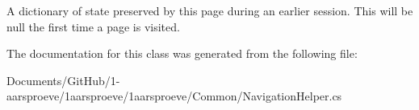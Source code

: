 A dictionary of state preserved by this page during an earlier session. This will be null the first time a page is visited. 



The documentation for this class was generated from the following file\+:\begin{DoxyCompactItemize}
\item 
Documents/\+Git\+Hub/1-\/aarsproeve/1aarsproeve/1aarsproeve/\+Common/Navigation\+Helper.\+cs\end{DoxyCompactItemize}
